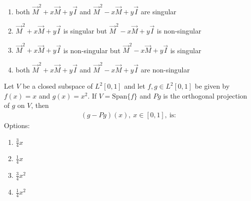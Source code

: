 \hfill{} 
\begin{enumerate}
     \item both $\vec{M}^2 + x\vec{M} + y\vec{I}$ and $\vec{M}^2 - x\vec{M} + y\vec{I}$ are singular
     \item  $\vec{M}^2 + x\vec{M} + y\vec{I}$ is singular but $\vec{M}^2 - x\vec{M} + y\vec{I}$ is non-singular
     \item  $\vec{M}^2 + x\vec{M} + y\vec{I}$ is non-singular but $\vec{M}^2 - x\vec{M} + y\vec{I}$ is singular
     \item  both $\vec{M}^2 + x\vec{M} + y\vec{I}$ and $\vec{M}^2 - x\vec{M} + y\vec{I}$ are non-singular
\end{enumerate}
\item Let \( V \) be a closed subspace of \( L^2[0,1] \) and let \( f, g \in L^2[0,1] \) be given by \( f(x) = x \) and \( g(x) = x^2 \).  
If \( V = \text{Span}\{f\} \) and \( Pg \) is the orthogonal projection of \( g \) on \( V \), then  
\begin{align*}
(g - Pg)(x), \ x \in [0,1], \ \text{is:} 
 \end{align*}
Options:
\hfill{}  
\begin{multicols}{4}
\begin{enumerate}
  \item $\frac{3}{4}x$
  \item $\frac{1}{4}x$
  \item $\frac{3}{4}x^2$
  \item $\frac{1}{4}x^2$
\end{enumerate}
\end{multicols}

